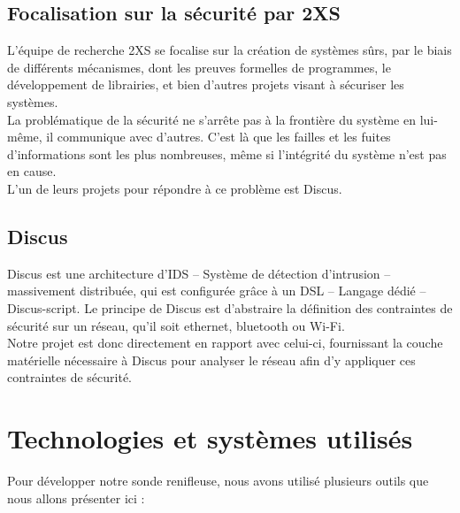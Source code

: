 	\subsection{Focalisation sur la sécurité par 2XS}
		L'équipe de recherche 2XS se focalise sur la création de systèmes sûrs, par le biais de différents mécanismes, dont les preuves formelles de programmes, le développement de librairies, et bien d'autres projets visant à sécuriser les systèmes.\\
		
		La problématique de la sécurité ne s'arrête pas à la frontière du système en lui-même, il communique avec d'autres. C'est là que les failles et les fuites d'informations sont les plus nombreuses, même si l'intégrité du système n'est pas en cause.\\
		L'un de leurs projets pour répondre à ce problème est Discus.
	
	\subsection{Discus}
	Discus est une architecture d'IDS -- Système de détection d'intrusion -- massivement distribuée, qui est configurée grâce à un DSL -- Langage dédié -- Discus-script. Le principe de Discus est d'abstraire la définition des contraintes de sécurité sur un réseau, qu'il soit ethernet, bluetooth ou Wi-Fi.\\
	Notre projet est donc directement en rapport avec celui-ci, fournissant la couche matérielle nécessaire à Discus pour analyser le réseau afin d'y appliquer ces contraintes de sécurité.

\section{Technologies et systèmes utilisés}
	Pour développer notre sonde renifleuse, nous avons utilisé plusieurs outils que nous allons présenter ici :
	

